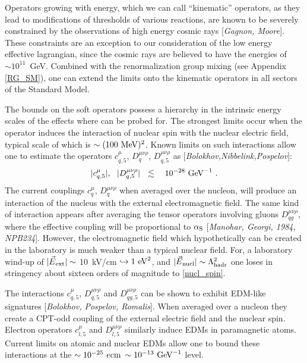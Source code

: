 \documentclass[12pt]{revtex4}
\begin{document}
	Operators growing with energy, which we can call ``kinematic'' operators,
	as they lead to modifications of thresholds of various reactions, are 
	known to be severely constrained by the
	observations of high energy cosmic rays [{\it Gagnon, Moore}].
	These constraints are an exception to our consideration of the low energy 
	effective lagrangian, since the cosmic rays are believed to have the
	energies of $ \sim 10^{11} $~GeV.
	Combined with the renormalization group mixing
	(see Appendix \ref{RG_SM}), one can extend
	the limits onto the kinematic operators in all sectors of the Standard Model.
	

	The bounds on the soft operators possess a hierarchy in the 
	intrinsic energy scales of the effects where can be probed for.
	The strongest limits occur when the operator induces the interaction 
	of nuclear spin with the nuclear electric field, typical scale of which
	is $ \sim (100~{\rm MeV})^2 $.
	Known limits on such interactions allow one to estimate the operators $ c^\mu_{q,5} $, 
	$ D^{\mu\nu\rho}_q $, $ D^{\mu\nu\rho}_{q,5} $ as
	[{\it Bolokhov,Nibbelink,Pospelov}]:
\begin{equation}
\label{nucl_spin}
	|c^\mu_{q,5}|,~~ |D^{\mu\nu\rho}_{q,5}| ~~\lesssim~~~
	10^{-28}~{\rm GeV}^{-1}~.
\end{equation}
	The current couplings $ c_q^\mu $, $ D^{\mu\nu\rho}_q $  when averaged over the nucleon, 
	will produce an interaction of the nucleus with the external electromagnetic field.
	The same kind of interaction appears after averaging the tensor operators
	involving gluons $ D^{\mu\nu\rho}_{qg} $, where the effective coupling will be
	proportional to $ \alpha_{\rm S} $ [{\it Manohar, Georgi, 1984, NPB234}]. 
	However, the electromagnetic field which hypothetically can be created in the laboratory
	is much weaker than a typical nuclear field.
	For, a laboratory wind-up of $ |\vec{E}{}_{\rm ext}| \sim $ 10~kV/cm 
	$ \hookrightarrow 1~{\rm eV}^2 $, and 
	$ |\vec{E}{}_{\rm nucl}| \sim \Lambda_{\rm hadr}^2 $
	one loses in stringency about sixteen orders of magnitude to \eqref{nucl_spin}.
	
	The interactions $ c^\mu_{q,5} $, $ D^{\mu\nu\rho}_{q,5} $ and
	$ D^{\mu\nu\rho}_{qg,5} $ can be shown to exhibit EDM-like signatures
	[{\it Bolokhov, Pospelov, Romalis}].
	When averaged over a nucleon they create a CPT-odd coupling of the external electric 
	field and the nuclear spin. 
	Electron operators $ c_{l,5}^\mu $ and $ D_{l,5}^{\mu\nu\rho} $ similarly induce
	EDMs in paramagnetic atoms. 
	Current limits on atomic and nuclear EDMs allow one to bound these interactions
	at the $ \sim 10^{-25}~e{\rm cm} $ $ \sim 10^{-13}~{\rm GeV}^{-1} $ level.
	
\end{document}

